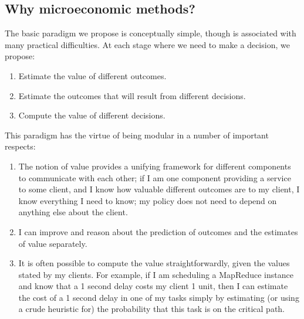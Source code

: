 \documentclass{acm_proc_article-sp}
\begin{document}

\subsection{Why microeconomic methods?}
The basic paradigm we propose is conceptually simple, though is associated with
many practical difficulties. At each stage where we need to make a decision, we
propose:
\vspace{-5mm}
\begin{enumerate}
\itemsep0em
  \item Estimate the value of different outcomes.
  \item Estimate the outcomes that will result from different decisions.
  \item Compute the value of different decisions.
\end{enumerate}
\vspace{-5mm}  
This paradigm has the virtue of being modular in a number of important respects:
\vspace{-5mm}
\begin{enumerate}
\itemsep0em
  \item The notion of value provides a unifying framework for different
    components to communicate with each other; if I am one component providing a
    service to some client, and I know how valuable different outcomes are to my
    client, I know everything I need to know; my policy does not need to depend
    on anything else about the client.
  \item I can improve and reason about the prediction of outcomes and the
    estimates of value separately. 
  \item It is often possible to compute the value straightforwardly, given the
    values stated  by my clients. For example, if I am scheduling a MapReduce
    instance and know that a 1 second delay costs my client 1 unit, then I can
    estimate the cost of a 1 second delay in one of my tasks simply by
    estimating (or using a crude heuristic for) the probability that this task
    is on the critical path.
\end{enumerate}
\end{document}

